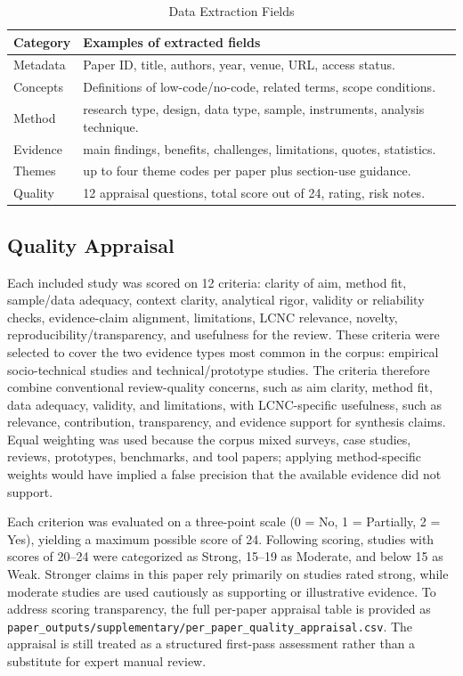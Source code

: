 \documentclass[conference]{IEEEtran}
\begin{document}
\begin{table}[t]
\centering
\caption{Data Extraction Fields}
\label{tab:extraction}
\scriptsize
\begin{tabularx}{\columnwidth}{p{}X}
\toprule
Category & Examples of extracted fields \\
\midrule
Metadata & Paper ID, title, authors, year, venue, URL, access status. \\
Concepts & Definitions of low-code/no-code, related terms, scope conditions. \\
Method & research type, design, data type, sample, instruments, analysis technique. \\
Evidence & main findings, benefits, challenges, limitations, quotes, statistics. \\
Themes & up to four theme codes per paper plus section-use guidance. \\
Quality & 12 appraisal questions, total score out of 24, rating, risk notes. \\
\bottomrule
\end{tabularx}
\end{table}

\subsection{Quality Appraisal}
Each included study was scored on 12 criteria: clarity of aim, method fit, sample/data adequacy, context clarity, analytical rigor, validity or reliability checks, evidence-claim alignment, limitations, LCNC relevance, novelty, reproducibility/transparency, and usefulness for the review. These criteria were selected to cover the two evidence types most common in the corpus: empirical socio-technical studies and technical/prototype studies. The criteria therefore combine conventional review-quality concerns, such as aim clarity, method fit, data adequacy, validity, and limitations, with LCNC-specific usefulness, such as relevance, contribution, transparency, and evidence support for synthesis claims. Equal weighting was used because the corpus mixed surveys, case studies, reviews, prototypes, benchmarks, and tool papers; applying method-specific weights would have implied a false precision that the available evidence did not support.

Each criterion was evaluated on a three-point scale (0 = No, 1 = Partially, 2 = Yes), yielding a maximum possible score of 24. Following scoring, studies with scores of 20--24 were categorized as Strong, 15--19 as Moderate, and below 15 as Weak. Stronger claims in this paper rely primarily on studies rated strong, while moderate studies are used cautiously as supporting or illustrative evidence. To address scoring transparency, the full per-paper appraisal table is provided as \texttt{paper\_outputs/supplementary/per\_paper\_quality\_appraisal.csv}. The appraisal is still treated as a structured first-pass assessment rather than a substitute for expert manual review.
\end{document}
